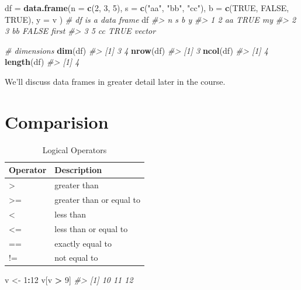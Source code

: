 \documentclass[]{book}
\newenvironment{Shaded}{\begin{snugshade}}{\end{snugshade}}
\newcommand{\CommentTok}[1]{\textcolor[rgb]{0.56,0.35,0.01}{\textit{#1}}}
\newcommand{\DataTypeTok}[1]{\textcolor[rgb]{0.13,0.29,0.53}{#1}}
\newcommand{\DecValTok}[1]{\textcolor[rgb]{0.00,0.00,0.81}{#1}}
\newcommand{\KeywordTok}[1]{\textcolor[rgb]{0.13,0.29,0.53}{\textbf{#1}}}
\newcommand{\NormalTok}[1]{#1}
\newcommand{\OperatorTok}[1]{\textcolor[rgb]{0.81,0.36,0.00}{\textbf{#1}}}
\newcommand{\OtherTok}[1]{\textcolor[rgb]{0.56,0.35,0.01}{#1}}
\newcommand{\StringTok}[1]{\textcolor[rgb]{0.31,0.60,0.02}{#1}}
\theoremstyle{definition}
\theoremstyle{definition}
\theoremstyle{definition}
\theoremstyle{remark}
\begin{document}
\begin{Shaded}
\begin{Highlighting}[]
\NormalTok{df =}\StringTok{ }\KeywordTok{data.frame}\NormalTok{(}\DataTypeTok{n =} \KeywordTok{c}\NormalTok{(}\DecValTok{2}\NormalTok{, }\DecValTok{3}\NormalTok{, }\DecValTok{5}\NormalTok{),}
                \DataTypeTok{s =} \KeywordTok{c}\NormalTok{(}\StringTok{"aa"}\NormalTok{, }\StringTok{"bb"}\NormalTok{, }\StringTok{"cc"}\NormalTok{),}
                \DataTypeTok{b =} \KeywordTok{c}\NormalTok{(}\OtherTok{TRUE}\NormalTok{, }\OtherTok{FALSE}\NormalTok{, }\OtherTok{TRUE}\NormalTok{),}
                \DataTypeTok{y =}\NormalTok{ v}
\NormalTok{                )       }\CommentTok{# df is a data frame }
\NormalTok{df}
\CommentTok{#>   n  s     b      y}
\CommentTok{#> 1 2 aa  TRUE     my}
\CommentTok{#> 2 3 bb FALSE  first}
\CommentTok{#> 3 5 cc  TRUE vector}

\CommentTok{# dimensions}
\KeywordTok{dim}\NormalTok{(df)}
\CommentTok{#> [1] 3 4}
\KeywordTok{nrow}\NormalTok{(df)}
\CommentTok{#> [1] 3}
\KeywordTok{ncol}\NormalTok{(df)}
\CommentTok{#> [1] 4}
\KeywordTok{length}\NormalTok{(df)}
\CommentTok{#> [1] 4}
\end{Highlighting}
\end{Shaded}

We'll discuss data frames in greater detail later in the course.

\hypertarget{comparision}{%
\section{Comparision}\label{comparision}}

\begin{table}

\caption{\label{tab:table-logicalOps}Logical Operators}
\centering
\begin{tabular}[t]{ll}
\toprule
Operator & Description\\
\midrule
> & greater than\\
>= & greater than or equal to\\
< & less than\\
<= & less than or equal to\\
== & exactly equal to\\
!= & not equal to\\
\bottomrule
\end{tabular}
\end{table}

\begin{Shaded}
\begin{Highlighting}[]
\NormalTok{v <-}\StringTok{ }\DecValTok{1}\OperatorTok{:}\DecValTok{12}
\NormalTok{v[v }\OperatorTok{>}\StringTok{ }\DecValTok{9}\NormalTok{]}
\CommentTok{#> [1] 10 11 12}
\end{Highlighting}
\end{Shaded}
\end{document}

